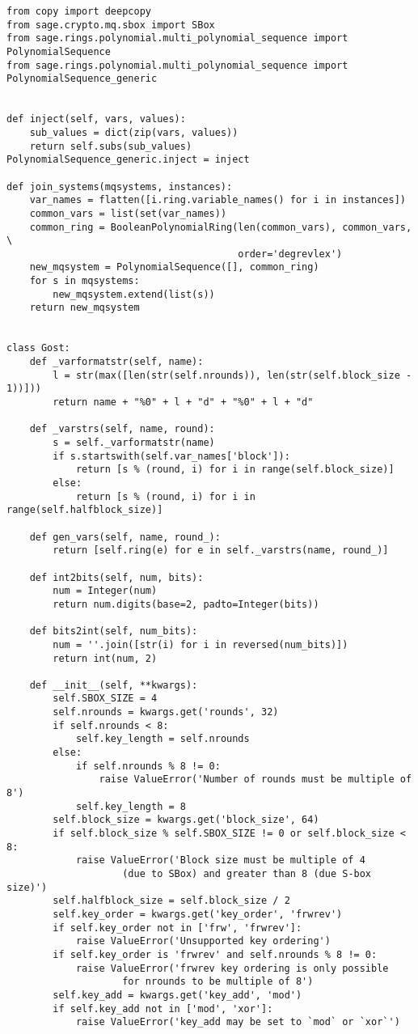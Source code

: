 \begin{lstlisting}
from copy import deepcopy
from sage.crypto.mq.sbox import SBox
from sage.rings.polynomial.multi_polynomial_sequence import PolynomialSequence
from sage.rings.polynomial.multi_polynomial_sequence import PolynomialSequence_generic


def inject(self, vars, values):
    sub_values = dict(zip(vars, values))
    return self.subs(sub_values)
PolynomialSequence_generic.inject = inject

def join_systems(mqsystems, instances):
    var_names = flatten([i.ring.variable_names() for i in instances])
    common_vars = list(set(var_names))
    common_ring = BooleanPolynomialRing(len(common_vars), common_vars, \
                                        order='degrevlex')
    new_mqsystem = PolynomialSequence([], common_ring)
    for s in mqsystems:
        new_mqsystem.extend(list(s))
    return new_mqsystem


class Gost:
    def _varformatstr(self, name):
        l = str(max([len(str(self.nrounds)), len(str(self.block_size - 1))]))
        return name + "%0" + l + "d" + "%0" + l + "d"

    def _varstrs(self, name, round):
        s = self._varformatstr(name)
        if s.startswith(self.var_names['block']):
            return [s % (round, i) for i in range(self.block_size)]
        else:
            return [s % (round, i) for i in range(self.halfblock_size)]

    def gen_vars(self, name, round_):
        return [self.ring(e) for e in self._varstrs(name, round_)]

    def int2bits(self, num, bits):
        num = Integer(num)
        return num.digits(base=2, padto=Integer(bits))

    def bits2int(self, num_bits):
        num = ''.join([str(i) for i in reversed(num_bits)])
        return int(num, 2)

    def __init__(self, **kwargs):
        self.SBOX_SIZE = 4
        self.nrounds = kwargs.get('rounds', 32)
        if self.nrounds < 8:
            self.key_length = self.nrounds
        else:
            if self.nrounds % 8 != 0:
                raise ValueError('Number of rounds must be multiple of 8')
            self.key_length = 8
        self.block_size = kwargs.get('block_size', 64)
        if self.block_size % self.SBOX_SIZE != 0 or self.block_size < 8:
            raise ValueError('Block size must be multiple of 4
                    (due to SBox) and greater than 8 (due S-box size)')
        self.halfblock_size = self.block_size / 2
        self.key_order = kwargs.get('key_order', 'frwrev')
        if self.key_order not in ['frw', 'frwrev']:
            raise ValueError('Unsupported key ordering')
        if self.key_order is 'frwrev' and self.nrounds % 8 != 0:
            raise ValueError('frwrev key ordering is only possible
                    for nrounds to be multiple of 8')
        self.key_add = kwargs.get('key_add', 'mod')
        if self.key_add not in ['mod', 'xor']:
            raise ValueError('key_add may be set to `mod` or `xor`')


\end{lstlisting}
